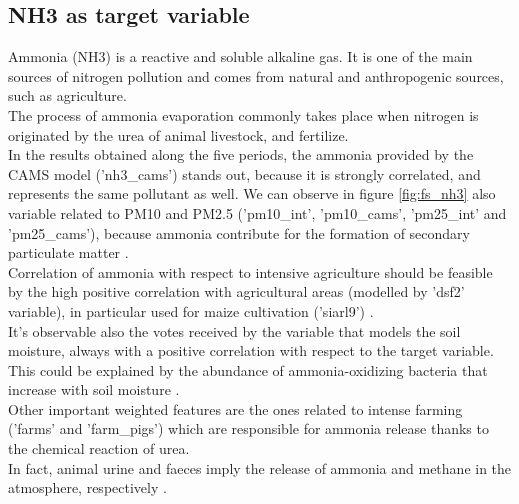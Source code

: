 \subsection{NH3 as target variable}
Ammonia (NH3) is a reactive and soluble alkaline gas. It is one of the main sources of nitrogen pollution and comes from natural and anthropogenic sources, such as agriculture.\\
The process of ammonia evaporation commonly takes place when nitrogen is originated by the urea of animal livestock, and fertilize. \\
In the results obtained along the five periods, the ammonia provided by the CAMS model ('nh3\_cams') stands out, because it is strongly correlated, and represents the same pollutant as well.
We can observe in figure \ref{fig:fs_nh3} also variable related to PM10 and PM2.5 ('pm10\_int', 'pm10\_cams', 'pm25\_int' and 'pm25\_cams'), because ammonia contribute for the formation of secondary particulate matter \cite{dai2019concentrations} \cite{zhu2015sources}.\\
Correlation of ammonia with respect to intensive agriculture should be feasible by the high positive correlation with agricultural areas (modelled by 'dsf2' variable), in particular used for maize cultivation ('siarl9') .\\
It's observable also the votes received by the variable that models the soil moisture, always with a positive correlation with respect to the target variable. This could be explained by the abundance of ammonia-oxidizing bacteria that increase with soil moisture \cite{avrahami2007response}.  \\
Other important weighted features are the ones related to intense farming ('farms' and 'farm\_pigs') which are responsible for ammonia release thanks to the chemical reaction of urea.\\
In fact, animal urine and faeces imply the release of ammonia and methane in the atmosphere, respectively \cite{saggar2004review}.


